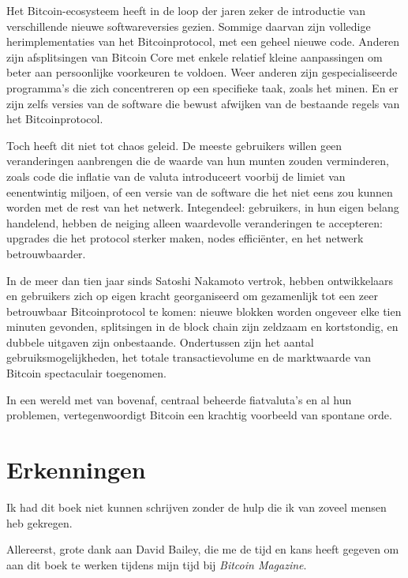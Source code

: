 \documentclass[smalldemyvopaper,11pt,twoside,onecolumn,openright,extrafontsizes,hidelinks]{memoir}
\begin{document}
Het Bitcoin-ecosysteem heeft in de loop der jaren zeker de introductie
van verschillende nieuwe softwareversies gezien. Sommige daarvan zijn
volledige herimplementaties van het Bitcoinprotocol, met een geheel
nieuwe code. Anderen zijn afsplitsingen van Bitcoin Core met enkele
relatief kleine aanpassingen om beter aan persoonlijke voorkeuren te
voldoen. Weer anderen zijn gespecialiseerde programma's die zich
concentreren op een specifieke taak, zoals het minen. En er zijn zelfs
versies van de software die bewust afwijken van de bestaande regels van
het Bitcoinprotocol.

Toch heeft dit niet tot chaos geleid. De meeste gebruikers willen geen
veranderingen aanbrengen die de waarde van hun munten zouden
verminderen, zoals code die inflatie van de valuta introduceert voorbij
de limiet van eenentwintig miljoen, of een versie van de software die
het niet eens zou kunnen worden met de rest van het netwerk.
Integendeel: gebruikers, in hun eigen belang handelend, hebben de
neiging alleen waardevolle veranderingen te accepteren: upgrades die het
protocol sterker maken, nodes efficiënter, en het netwerk
betrouwbaarder.

In de meer dan tien jaar sinds Satoshi Nakamoto vertrok, hebben
ontwikkelaars en gebruikers zich op eigen kracht georganiseerd om
gezamenlijk tot een zeer betrouwbaar Bitcoinprotocol te komen: nieuwe
blokken worden ongeveer elke tien minuten gevonden, splitsingen in de
block chain zijn zeldzaam en kortstondig, en dubbele uitgaven zijn
onbestaande. Ondertussen zijn het aantal gebruiksmogelijkheden, het
totale transactievolume en de marktwaarde van Bitcoin spectaculair
toegenomen.

In een wereld met van bovenaf, centraal beheerde fiatvaluta's en al hun
problemen, vertegenwoordigt Bitcoin een krachtig voorbeeld van spontane
orde.


\chapter*{Erkenningen}\label{erkenningen}


Ik had dit boek niet kunnen schrijven zonder de hulp die ik van zoveel
mensen heb gekregen.

Allereerst, grote dank aan David Bailey, die me de tijd en kans heeft
gegeven om aan dit boek te werken tijdens mijn tijd bij \emph{Bitcoin
Magazine}.
\end{document}
